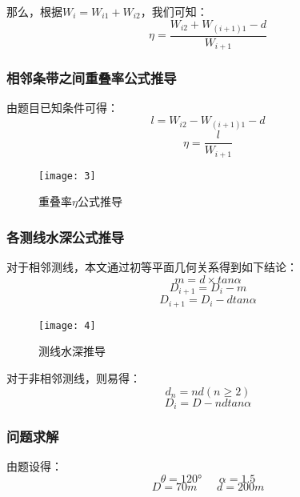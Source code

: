 \documentclass[withoutpreface,bwprint]{cumcmthesis} %
\begin{document}
那么，根据$W_{i}=W_{i1}+W_{i2}$，我们可知：
\begin{equation}
\eta=\frac{W_{i2}+W_{(i+1)1}-d}{W_{i+1}}
\end{equation}
\subsubsection{相邻条带之间重叠率公式推导}
由题目已知条件可得：
\begin{equation}
l=W_{i2}-W_{(i+1)1}-d
\end{equation}
\begin{equation}
\eta=\frac{l}{W_{i+1}}
\end{equation}
\begin{figure}[H]
    \centering
    \texttt{[image: 3]}
    \caption{重叠率$\eta$公式推导}
    \label{fig:three}
\end{figure}

\subsubsection{各测线水深公式推导}
对于相邻测线，本文通过初等平面几何关系得到如下结论：
\begin{equation}
m=d\times tan\alpha
\end{equation}
\begin{equation}
D_{i+1}=D_i-m
\end{equation}
\begin{equation}
D_{i+1}=D_i-dtan\alpha
\end{equation}
\begin{figure}[H]
    \centering
    \texttt{[image: 4]}
    \caption{测线水深推导}
    \label{fig:four}
\end{figure}

对于非相邻测线，则易得：
\begin{equation}
d_n=nd(n\geq2)
\end{equation}
\begin{equation}
D_i=D-ndtan\alpha
\end{equation}
\subsubsection{问题求解}
由题设得：
\begin{equation}
\theta=120°\ \ \ \ \ \ \ \alpha=1.5
\end{equation}
\begin{equation}
D=70m\ \ \ \ \ \ \ \ d=200m
\end{equation}
\end{document}
